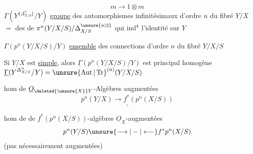 \[
m\longrightarrow1\otimes m
\]
$\Gamma(Y^{\{\Delta^n_{X/S}\}}/Y)$ \uline{groupe} des automorphismes infinitésimaux d'ordre $n$ du fibré $Y/X$
$=$  des  de $\pi^n(Y/X/S)/\Delta^{\unsure{n|2}}_{X/S}$ qui ind$^{\rm t}$ l'identité sur $Y$

$\Gamma(p^n(Y/X/S)/Y)$ \uline{ensemble} des connections d'ordre $n$ du fibré $Y/X/S$

Si $Y/X$ est \uline{simple}, alors  $\underline{\Gamma}(p^n(Y/X/S)/Y)$ est principal homogène  $\underline{\Gamma}(Y^{\Delta^n_{X/S}}/Y)={\unsure{\operatorname{Aut}|\operatorname{Tr}}}^{(n)}(Y/X/S)$

hom de $\underline{O}_{\deleted{\unsure{X}}Y}$-Algèbres augmentées
\[
\underline{\underline{p^n(Y/X)\longrightarrow f^*(p^n(X/S))}}
\]

hom de de $f^*(p^n(X/S))$-algèbres $\underline{O}_X$-augmentées
\[
p^n(Y/S)\unsure{\longrightarrow|-|\longleftarrow}f^*p^n(X/S)
\]
(pas nécessairement augmentées)

